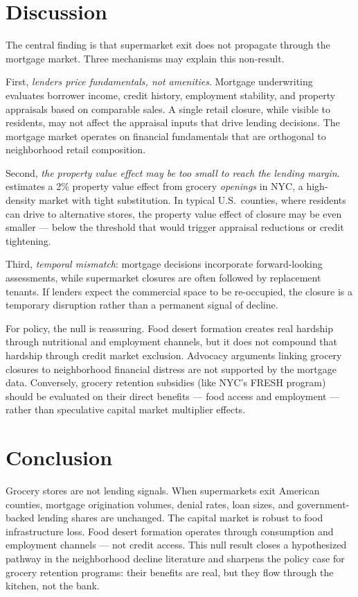 \documentclass[12pt]{article}
\begin{document}
\section{Discussion}

The central finding is that supermarket exit does not propagate through the mortgage market. Three mechanisms may explain this non-result.

First, \textit{lenders price fundamentals, not amenities}. Mortgage underwriting evaluates borrower income, credit history, employment stability, and property appraisals based on comparable sales. A single retail closure, while visible to residents, may not affect the appraisal inputs that drive lending decisions. The mortgage market operates on financial fundamentals that are orthogonal to neighborhood retail composition.

Second, \textit{the property value effect may be too small to reach the lending margin}. \citet{kolea2021fresh} estimates a 2\% property value effect from grocery \textit{openings} in NYC, a high-density market with tight substitution. In typical U.S.\ counties, where residents can drive to alternative stores, the property value effect of closure may be even smaller --- below the threshold that would trigger appraisal reductions or credit tightening.

Third, \textit{temporal mismatch}: mortgage decisions incorporate forward-looking assessments, while supermarket closures are often followed by replacement tenants. If lenders expect the commercial space to be re-occupied, the closure is a temporary disruption rather than a permanent signal of decline.

For policy, the null is reassuring. Food desert formation creates real hardship through nutritional and employment channels, but it does not compound that hardship through credit market exclusion. Advocacy arguments linking grocery closures to neighborhood financial distress are not supported by the mortgage data. Conversely, grocery retention subsidies (like NYC's FRESH program) should be evaluated on their direct benefits --- food access and employment --- rather than speculative capital market multiplier effects.

\section{Conclusion}

Grocery stores are not lending signals. When supermarkets exit American counties, mortgage origination volumes, denial rates, loan sizes, and government-backed lending shares are unchanged. The capital market is robust to food infrastructure loss. Food desert formation operates through consumption and employment channels --- not credit access. This null result closes a hypothesized pathway in the neighborhood decline literature and sharpens the policy case for grocery retention programs: their benefits are real, but they flow through the kitchen, not the bank.
\end{document}
